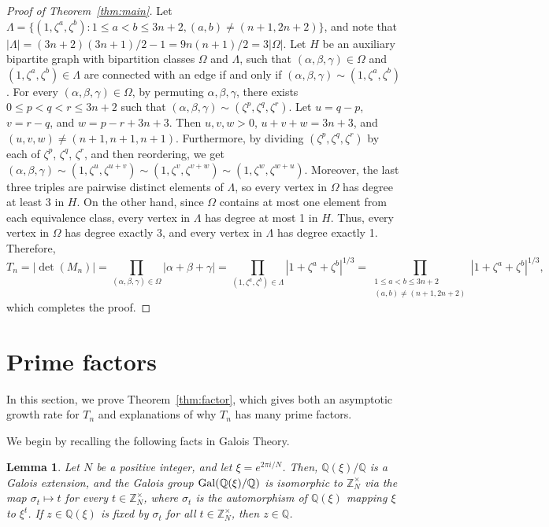 \documentclass{article}
\newtheorem{lemma}[theorem]{Lemma}
\begin{document}
\begin{proof}[Proof of Theorem~\ref{thm:main}]
Let $\Lambda=\{(1,\zeta^a,\zeta^b):1\leq a<b\leq 3n+2,(a,b)\not=(n+1,2n+2)\}$, and note that $|\Lambda|=(3n+2)(3n+1)/2-1=9n(n+1)/2=3|\Omega|$. Let $H$ be an auxiliary bipartite graph with bipartition classes $\Omega$ and $\Lambda$, such that $(\alpha,\beta,\gamma)\in \Omega$ and $(1,\zeta^a,\zeta^b)\in \Lambda$ are connected with an edge if and only if $(\alpha,\beta,\gamma)\sim(1,\zeta^a,\zeta^b)$. For every $(\alpha,\beta,\gamma)\in \Omega$, by permuting $\alpha,\beta,\gamma$, there exists $0\leq p<q<r\leq 3n+2$ such that $(\alpha,\beta,\gamma)\sim(\zeta^p,\zeta^q,\zeta^r)$. Let $u=q-p$, $v=r-q$, and $w=p-r+3n+3$. Then $u,v,w>0$, $u+v+w=3n+3$, and $(u,v,w)\not=(n+1,n+1,n+1)$. Furthermore, by dividing $(\zeta^p,\zeta^q,\zeta^r)$ by each of $\zeta^p$, $\zeta^q$, $\zeta^r$, and then reordering, we get $(\alpha,\beta,\gamma)\sim(1,\zeta^u,\zeta^{u+v})\sim(1,\zeta^v,\zeta^{v+w})\sim(1,\zeta^w,\zeta^{w+u})$. Moreover, the last three triples are pairwise distinct elements of $\Lambda$, so every vertex in $\Omega$ has degree at least 3 in $H$. On the other hand, since $\Omega$ contains at most one element from each equivalence class, every vertex in $\Lambda$ has degree at most 1 in $H$. Thus, every vertex in $\Omega$ has degree exactly 3, and every vertex in $\Lambda$ has degree exactly 1. Therefore,
\[T_n=|\det(M_n)|=\prod_{(\alpha,\beta,\gamma)\in \Omega}|\alpha+\beta+\gamma|=\prod_{(1,\zeta^a,\zeta^b)\in \Lambda}|1+\zeta^a+\zeta^b|^{1/3}=\prod_{\substack{1\leq a<b\leq 3n+2\\(a,b)\not=(n+1,2n+2)}}|1+\zeta^a+\zeta^b|^{1/3},\]
which completes the proof.
\end{proof}


\section{Prime factors}\label{sec:factor}
In this section, we prove Theorem~\ref{thm:factor}, which gives both an asymptotic growth rate for $T_n$ and explanations of why $T_n$ has many prime factors. 

We begin by recalling the following facts in Galois Theory. 
\begin{lemma}\label{lemma:rootgalois}
Let $N$ be a positive integer, and let $\xi=e^{2\pi i/N}$. Then, $\mathbb{Q}(\xi)/\mathbb{Q}$ is a Galois extension, and the Galois group $\textup{Gal}(\mathbb{Q}(\xi)/\mathbb{Q})$ is isomorphic to $\mathbb{Z}_N^\times$ via the map $\sigma_t\mapsto t$ for every $t\in\mathbb{Z}_N^\times$, where $\sigma_t$ is the automorphism of $\mathbb{Q}(\xi)$ mapping $\xi$ to $\xi^t$. If $z\in\mathbb{Q}(\xi)$ is fixed by $\sigma_t$ for all $t\in\mathbb{Z}_N^\times$, then $z\in\mathbb{Q}$.
\end{lemma}
\end{document}

